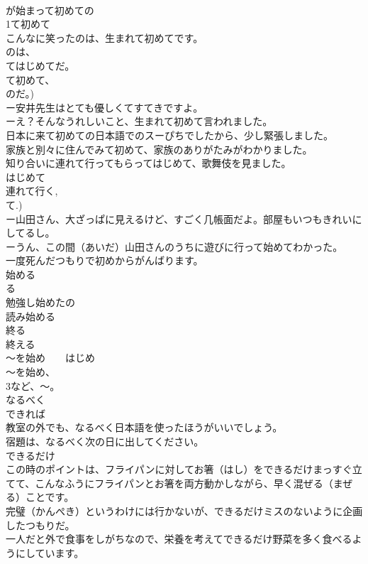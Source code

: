 \documentclass[8pt]{extreport}
\begin{document}
\begin{CJK}{UTF8}{min}
\\	が始まって初めての
\\	1て初めて
\\	こんなに笑ったのは、生まれて初めてです。
\\	のは、
\\	てはじめてだ。 
\\	て初めて、
\\	のだ。)
\\	ー安井先生はとても優しくてすてきですよ。
\\	ーえ？そんなうれしいこと、生まれて初めて言われました。
\\	日本に来て初めての日本語でのスーぴちでしたから、少し緊張しました。
\\	家族と別々に住んでみて初めて、家族のありがたみがわかりました。
\\	知り合いに連れて行ってもらってはじめて、歌舞伎を見ました。
\\	はじめて 
\\	連れて行く, 
\\	て.)
\\	ー山田さん、大ざっぱに見えるけど、すごく几帳面だよ。部屋もいつもきれいにしてるし。
\\	ーうん、この間（あいだ）山田さんのうちに遊びに行って始めてわかった。
\\	一度死んだつもりで初めからがんばります。
\\	始める
\\	る
\\	勉強し始めたの 
\\	読み始める　
\\	終る　
\\	終える 
\\	～を始め　　はじめ
\\	～を始め、
\\	3など、～。	
\\	なるべく
\\	できれば
\\	教室の外でも、なるべく日本語を使ったほうがいいでしょう。
\\	宿題は、なるべく次の日に出してください。
\\	できるだけ
\\	この時のポイントは、フライパンに対してお箸（はし）をできるだけまっすぐ立てて、こんなふうにフライパンとお箸を両方動かしながら、早く混ぜる（まぜる）ことです。
\\	完璧（かんぺき）というわけには行かないが、できるだけミスのないように企画したつもりだ。
\\	一人だと外で食事をしがちなので、栄養を考えてできるだけ野菜を多く食べるようにしています。

\end{CJK}
\end{document}
